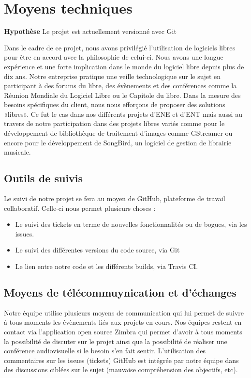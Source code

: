 \section{Moyens techniques}
\begin{exemple}
\textbf{Hypothèse} Le projet \correlyce{} est actuellement versionné avec Git 
\end{exemple}
Dans le cadre de ce projet, nous avons privilégié l’utilisation de logiciels libres pour être en accord avec la philosophie de celui-ci. 
Nous avons une longue expérience et une forte implication dans le monde du logiciel libre depuis plus de dix ans.
Notre entreprise pratique une veille technologique sur le sujet en participant à des forums du libre, des évènements et des conférences comme la Réunion Mondiale du Logiciel Libre ou le Capitole du libre. Dans la mesure des besoins spécifiques du client, nous nous efforçons de proposer des solutions «libres».  Ce fut le cas dans nos différents projets d’ENE et d’ENT mais aussi au travers de notre participation dans des projets libres variés comme pour le développement de bibliothèque de traitement d’images comme GStreamer ou encore pour le développement de SongBird, un logiciel de gestion de librairie musicale. 

	\subsection{Outils de suivis}
	Le suivi de notre projet se fera au moyen de GitHub, plateforme de travail collaboratif. Celle-ci nous permet plusieurs choses : 
	
	\begin{itemize}
		\item Le suivi des tickets en terme de nouvelles fonctionnalités ou de bogues, via les issues.
		\item Le suivi des différentes versions du code source, via Git
		\item Le lien entre notre code et les différents builds, via Travis CI.
	\end{itemize}
		
	\subsection{Moyens de télécommuynication et d'échanges}
	Notre équipe utilise plusieurs moyens de communication qui lui permet de suivre à tous moments les évènements liés aux projets en cours. Nos équipes restent en contact via l’application open source Zimbra qui permet d’avoir à tous moments la possibilité de discuter sur le projet ainsi que la possibilité de réaliser une conférence audiovisuelle si le besoin s’en fait sentir.
	L’utilisation des commentaires sur les issues (tickets) GitHub est intégrée par notre équipe dans des discussions ciblées sur le sujet (mauvaise compréhension des objectifs, etc).
	
